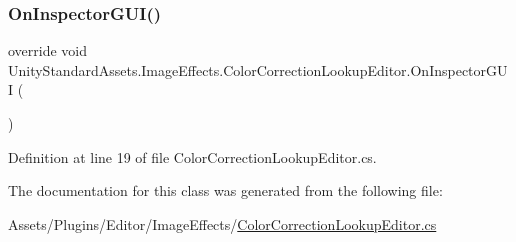 \subsubsection{\texorpdfstring{On\+Inspector\+G\+U\+I()}{OnInspectorGUI()}}
{\footnotesize\ttfamily override void Unity\+Standard\+Assets.\+Image\+Effects.\+Color\+Correction\+Lookup\+Editor.\+On\+Inspector\+G\+UI (\begin{DoxyParamCaption}{ }\end{DoxyParamCaption})}



Definition at line 19 of file Color\+Correction\+Lookup\+Editor.\+cs.



The documentation for this class was generated from the following file\+:\begin{DoxyCompactItemize}
\item 
Assets/\+Plugins/\+Editor/\+Image\+Effects/\mbox{\hyperlink{_color_correction_lookup_editor_8cs}{Color\+Correction\+Lookup\+Editor.\+cs}}\end{DoxyCompactItemize}
